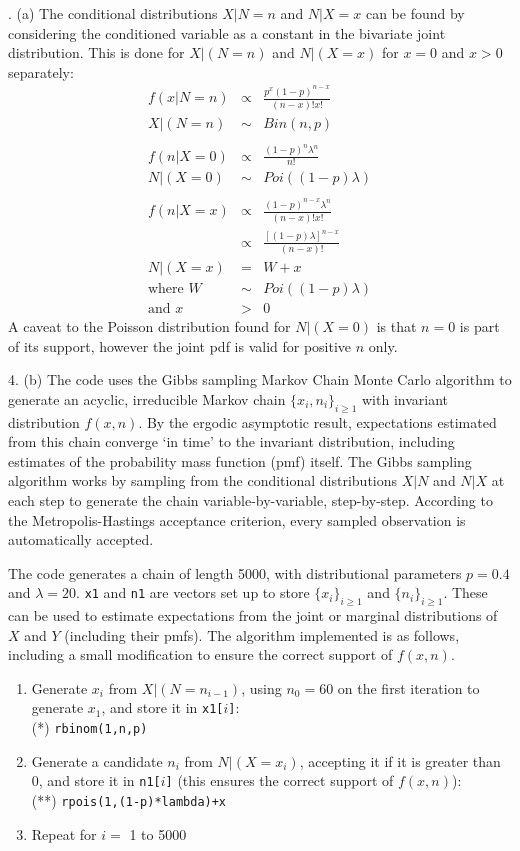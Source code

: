 \documentclass[a4paper,11pt]{article}
\begin{document}
. (a) The conditional distributions $X|N=n$ and $N|X=x$ can be found
by considering the conditioned variable as a constant in the bivariate
joint distribution. This is done for $X|(N=n)$ and $N|(X=x)$ for $x=0$
and $x>0$ separately:
\begin{eqnarray*}
  f(x|N=n) & \propto & \frac{p^x(1-p)^{n-x}}{(n-x)!x!}\\
  X|(N=n) & \sim & Bin(n,p)\\
  \\
  f(n|X=0) & \propto & \frac{(1-p)^n\lambda^n}{n!}\\
  N|(X=0) & \sim & Poi\left((1-p)\lambda\right)\\
  \\
  f(n|X=x) & \propto & \frac{(1-p)^{n-x}\lambda^n}{(n-x)!x!}\\
           & \propto & \frac{\left[(1-p)\lambda\right]^{n-x}}{(n-x)!}\\
  N|(X=x) & = & W + x\\
  \mbox{where } W & \sim & Poi\left((1-p)\lambda\right)\\
  \mbox{and } x & > & 0
\end{eqnarray*}
A caveat to the Poisson distribution found for $N|(X=0)$ is that $n=0$
is part of its support, however the joint pdf is valid for positive $n$
only.

4. (b) The code uses the Gibbs sampling Markov Chain Monte Carlo
algorithm to generate an acyclic, irreducible Markov chain
$\{x_i,n_i\}_{i\ge 1}$ with invariant distribution $f(x,n)$. By the
ergodic asymptotic result, expectations estimated from this chain
converge `in time' to the invariant distribution, including estimates
of the probability mass function (pmf) itself. The Gibbs
sampling algorithm works by sampling from the conditional
distributions $X|N$ and $N|X$ at each step to generate the chain
variable-by-variable, step-by-step. According to the
Metropolis-Hastings acceptance criterion, every sampled observation is
automatically accepted.

The code generates a chain of length 5000, with distributional
parameters $p=0.4$ and $\lambda=20$. \texttt{x1} and \texttt{n1} are
vectors set up to store $\{x_i\}_{i\ge 1}$ and $\{n_i\}_{i\ge
  1}$. These can be used to estimate expectations from the joint or
marginal distributions of $X$ and $Y$ (including their pmfs). The
algorithm implemented is as follows, including a
small modification to ensure the correct support of $f(x,n)$.

\begin{enumerate}
  \item Generate $x_i$ from $X|(N=n_{i-1})$, using $n_0=60$ on the first
    iteration to generate $x_1$, and store it in \texttt{x1[$i$]}:\\
    (*) \texttt{rbinom(1,n,p)}
  \item Generate a candidate $n_i$ from $N|(X=x_i)$, accepting it if it
  is greater than 0, and store it in \texttt{n1[$i$]} (this ensures
  the correct support of $f(x,n)$):\\
  (**)  \texttt{rpois(1,(1-p)*lambda)+x}
  \item Repeat for $i=$ 1 to 5000
\end{enumerate}
\end{document}
